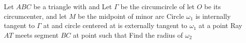 Let $ABC$ be a triangle with   and  Let $\Gamma$ be the circumcircle of  let $O$ be its circumcenter, and let $M$ be the midpoint of minor arc  Circle $\omega_1$ is internally tangent to $\Gamma$ at  and circle  centered at  is externally tangent to $\omega_1$ at a point  Ray $AT$ meets segment $BC$ at point  such that  Find the radius of $\omega_2$